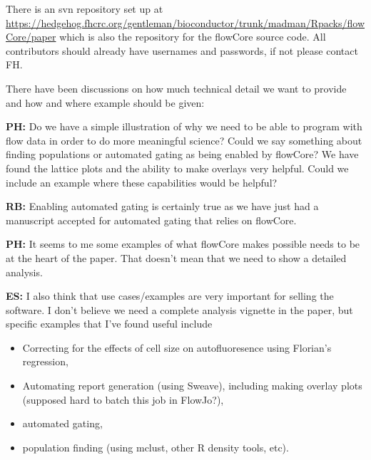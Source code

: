 \documentclass[12pt]{article}
\begin{document}
\bigskip
There is an svn repository set up at
\url{https://hedgehog.fhcrc.org/gentleman/bioconductor/trunk/madman/Rpacks/flowCore/paper}
which is also the repository for the flowCore source code. All
contributors should already have usernames and passwords, if not
please contact FH.

\bigskip
There have been discussions on how much technical detail we want to
provide and how and where example should be given:

{\bf PH:} Do we have a simple illustration of why we need to be able to
program with flow data in order to do more meaningful science? Could
we say something about finding populations or automated gating as
being enabled by flowCore?  We have found the lattice plots and the
ability to make overlays very helpful. Could we include an example
where these capabilities would be helpful?

{\bf RB:} Enabling automated gating is certainly true as we have just had a
manuscript accepted for automated gating that relies on flowCore.

{\bf PH:} It seems to me some examples of what flowCore makes possible needs
to be at the heart of the paper. That doesn't mean that we need to
show a detailed analysis.

{\bf ES:} I also think that use cases/examples are very important for selling
the software.  I don't believe we need a complete analysis vignette in
the paper, but specific examples that I've found useful include
\begin{itemize}
\item Correcting for the effects of cell size on autofluoresence using
  Florian's regression,
\item Automating report generation (using Sweave), including making
  overlay plots (supposed hard to batch this job in FlowJo?),
\item automated gating,
\item population finding (using mclust, other R density tools, etc).
\end{itemize}
\end{document}
